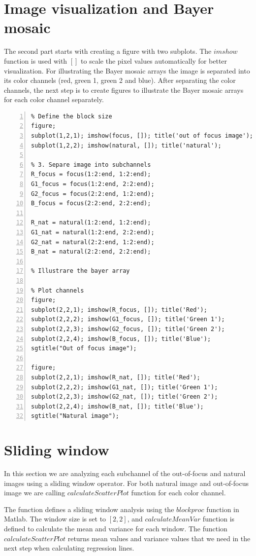 \documentclass[12pt,a4paper,english
]{tunithesis}
\begin{document}
\section{Image visualization and Bayer mosaic}
The second part starts with creating a figure with two subplots. The $imshow$ function is used with $[]$ to scale the pixel values automatically for better visualization. For illustrating the Bayer mosaic arrays the image is separated into its color channels (red, green 1, green 2 and blue). After separating the color channels, the next step is to create figures to illustrate the Bayer mosaic arrays for each color channel separately.
\begin{lstlisting}[style=Matlab-editor, numbers=left, basicstyle=\small]
% 2. Visualize Images, Bayer mosaic array
% Define the block size
figure;
subplot(1,2,1); imshow(focus, []); title('out of focus image');
subplot(1,2,2); imshow(natural, []); title('natural');

% 3. Separe image into subchannels
R_focus = focus(1:2:end, 1:2:end);
G1_focus = focus(1:2:end, 2:2:end);
G2_focus = focus(2:2:end, 1:2:end);
B_focus = focus(2:2:end, 2:2:end);

R_nat = natural(1:2:end, 1:2:end);
G1_nat = natural(1:2:end, 2:2:end);
G2_nat = natural(2:2:end, 1:2:end);
B_nat = natural(2:2:end, 2:2:end);

% Illustrare the bayer array

% Plot channels
figure;
subplot(2,2,1); imshow(R_focus, []); title('Red');
subplot(2,2,2); imshow(G1_focus, []); title('Green 1');
subplot(2,2,3); imshow(G2_focus, []); title('Green 2');
subplot(2,2,4); imshow(B_focus, []); title('Blue');
sgtitle("Out of focus image");

figure;
subplot(2,2,1); imshow(R_nat, []); title('Red');
subplot(2,2,2); imshow(G1_nat, []); title('Green 1');
subplot(2,2,3); imshow(G2_nat, []); title('Green 2');
subplot(2,2,4); imshow(B_nat, []); title('Blue');
sgtitle("Natural image");
\end{lstlisting}
\section{Sliding window}
In this section we are analyzing each subchannel of the out-of-focus and natural images using a sliding window operator. For both natural image and out-of-focus image we are calling $calculateScatterPlot$ function for each color channel.

The function defines a sliding window analysis using the $blockproc$ function in Matlab. The window size is set to $[2, 2]$, and $calculateMeanVar$ function is defined to calculate the mean and variance for each window. The function $calculateScatterPlot$ returns mean values and variance values that we need in the next step when calculating regression lines.
\end{document}
